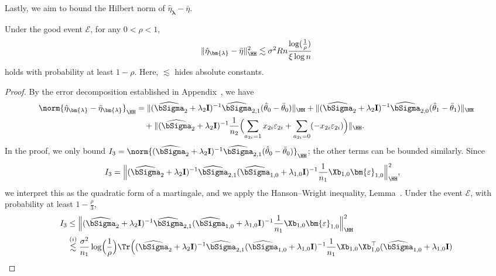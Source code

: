 \documentclass[12pt,a4paper,pdftex,onepage]{article}
\newcommand{\Sighat}{\widehat{{\bSigma}}}
\newcommand{\sig}{\sigma}
\newcommand{\event}{\mathscr{E}}
\begin{document}
Lastly, we aim to bound the Hilbert norm of $\hat{\eta}_{\bm{\lambda}}- \bar{\eta}$.

\begin{lemma}\label{lemma; variance hilbert norm bound}
Under the good event $\event$, for any \(0 < \rho <1\), 
\begin{align*}
\| \hat{\eta}_{\bm{\lambda}}- \bar{\eta}  \|^2_{\HH} \lesssim \sig^2 Rn\frac{\log(\frac{1}{\rho})}{\xi \log n}
\end{align*}
holds with probability at least \(1-\rho\).
Here, \(\lesssim\) hides absolute constants.
\end{lemma}

\begin{proof}
By the error decomposition established in Appendix~, we have
\begin{align*}
\norm{ \hat{\eta}_{\bm{\lambda}} -\bar{\eta}_{\bm{\lambda}} }_{\HH} &= \|  (\Sighat_2 + \lambda_2 \mathbf{I})^{-1} \Sighat_{2,1}(\hat{\theta}_0 -\bar{\theta}_0) \|_{\HH} + \| (\Sighat_2 + \lambda_2 \mathbf{I})^{-1} \Sighat_{2,0}(\hat{\theta}_1 -\bar{\theta}_1) \|_{\HH} \\
&\quad+ \| (\Sighat_2 + \lambda_2 \mathbf{I})^{-1} \frac{1}{n_2}\Bigl(  \sum_{a_{2i}=1}x_{2i}\varepsilon_{2i}+\sum_{a_{2i}=0} (- x_{2i}\varepsilon_{2i}) \Bigr) \|_{\HH}.
\end{align*}
In the proof, we only bound $I_3 = \norm{(\Sighat_2 + \lambda_2 \mathbf{I})^{-1} \Sighat_{2,1}(\hat{\theta}_0-\Bar{\theta}_0)}_{\HH}$; the other terms can be bounded similarly.
Since
\begin{align*}
I_3&= \Bigl\|   (\Sighat_2 + \lambda_2 \mathbf{I})^{-1}  \Sighat_{2,1} (\Sighat_{1,0}+\lambda_{1,0} \mathbf{I})
^{-1} \frac{1}{n_1} \Xb_{1,0} \bm{\varepsilon}_{1,0}\Bigr\|^2_{\HH},
\end{align*}
we interpret this as the quadratic form of a martingale, and we apply the Hanson--Wright inequality, Lemma~.
Under the event \(\event\), with probability at least $1-\frac{\rho}{3}$, 
\begin{align*}
I_3&\leq   \Bigl\|   (\Sighat_2 + \lambda_2 \mathbf{I})^{-1}  \Sighat_{2,1} (\Sighat_{1,0}+\lambda_{1,0} \mathbf{I})
^{-1} \frac{1}{n_1} \Xb_{1,0} \bm{\varepsilon}_{1,0}\Bigr\|^2_\HH\\
&\stackrel{(i)}{\lesssim }\frac{\sig^2}{n_1}\log\Bigl(\frac{1}{\rho}\Bigr)\Tr\Bigl((\Sighat_2 + \lambda_2 \mathbf{I})^{-1}  \Sighat_{2,1} (\Sighat_{1,0}+\lambda_{1,0} \mathbf{I})
^{-1} \frac{1}{n_1} \Xb_{1,0}\Xb_{1,0}^\top (\Sighat_{1,0}+\lambda_{1,0} \mathbf{I})

\end{align*}
\end{proof}
\end{document}
